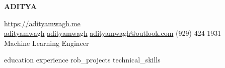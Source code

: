\documentclass[a4paper, 10pt]{article}
\begin{document}
\begin{center}
	\vspace*{-10pt}
	\begin{center}
		\uppercase{\Huge \bfseries Aditya }
	\end{center}
	\vspace{4pt}
	\href{https://adityamwagh.me}{https://adityamwagh.me} \\

	\vspace{4pt}
	\faLinkedin\space{} \href{https://linkedin.com/in/adityamwagh}{adityamwagh} \space{}
	\faGithub{} \space{} \href{https://github.com/adityamwagh}{adityamwagh} \space{}
	\faAt{} \space{} \href{mailto:adityamwagh@outlook.com}{adityamwagh@outlook.com} \space{}
	\faPhone{} \space{} (929) 424 1931 \\

	\vspace{8pt}
	Machine Learning Engineer
\end{center}

\justifying{}
{education}
{experience}
{rob_projects}
{technical_skills}

\end{document}
